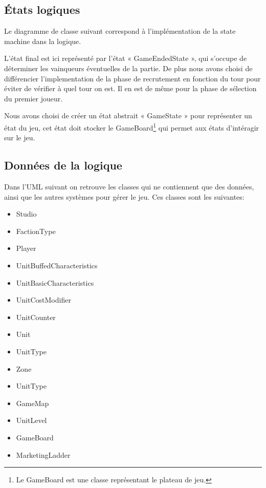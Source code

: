 \subsection{États logiques}

Le diagramme de classe suivant correspond à l'implémentation de la state machine
dans la logique.


L'état final est ici représenté par l'état « GameEndedState », qui s'occupe de
déterminer les vainqueurs éventuelles de la partie.
De plus nous avons choisi de différencier l'implementation de la phase de
recrutement en fonction du tour pour éviter de vérifier à quel tour on est.
Il en est de même pour la phase de sélection du premier joueur.

Nous avons choisi de créer un état abstrait « GameState » pour
représenter un état du jeu, cet état doit stocker le GameBoard\footnote{Le GameBoard
  est une classe représentant le plateau de jeu.}
qui permet aux états d'intéragir sur le jeu.

\subsection{Données de la logique}

Dans l'UML suivant on retrouve les classes qui ne contiennent que des données,
ainsi que les autres systèmes pour gérer le jeu.
Ces classes sont les suivantes:
\begin{itemize}
    \item Studio
    \item FactionType
    \item Player
    \item UnitBuffedCharacteristics
    \item UnitBasicCharacteristics
    \item UnitCostModifier
    \item UnitCounter
    \item Unit
    \item UnitType
    \item Zone
    \item UnitType
    \item GameMap
    \item UnitLevel
    \item GameBoard
    \item MarketingLadder
\end{itemize}

